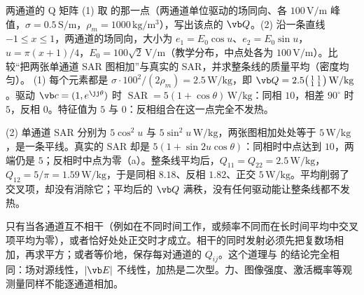 \begin{example}[label=ex:framework-twochannel]{两通道的 Q 矩阵}
(1) 取 的那一点（两通道单位驱动的场同向、各 $100\,\mathrm{V/m}$ 峰值，$\sigma=0.5\,\mathrm{S/m}$，$\rho_m=1000\,\mathrm{kg/m^3}$），写出该点的 $\vb Q$。(2) 沿一条直线 $-1\le x\le1$，两通道的场同向，大小为 $e_1=E_0\cos u$、$e_2=E_0\sin u$，$u=\pi(x+1)/4$，$E_0=100\sqrt2\,\mathrm{V/m}$（教学分布，中点处各为 $100\,\mathrm{V/m}$）。比较“把两张单通道 SAR 图相加”与真实的 SAR，并求整条线的质量平均（密度均匀）。
\solution
(1) 每个元素都是 $\sigma\cdot100^2/(2\rho_m)=2.5\,\mathrm{W/kg}$，即 $\vb Q=2.5\bigl(\begin{smallmatrix}1&1\\1&1\end{smallmatrix}\bigr)\,\mathrm{W/kg}$。驱动 $\vb c=(1,e^{\jj\theta})$ 时 $\operatorname{SAR}=5(1+\cos\theta)\,\mathrm{W/kg}$：同相 $10$，相差 $90^\circ$ 时 $5$，反相 $0$。特征值为 $5$ 与 $0$：反相组合在这一点完全不发热。

(2) 单通道 SAR 分别为 $5\cos^2u$ 与 $5\sin^2u\,\mathrm{W/kg}$，两张图相加处处等于 $5\,\mathrm{W/kg}$，是一条平线。真实的 SAR 却是 $5(1+\sin2u\cos\theta)$：同相时中点达到 $10$，两端仍是 $5$；反相时中点为零（a）。整条线平均后，$Q_{11}=Q_{22}=2.5\,\mathrm{W/kg}$，$Q_{12}=5/\pi=1.59\,\mathrm{W/kg}$，于是同相 $8.18$、反相 $1.82$、正交 $5\,\mathrm{W/kg}$。平均削弱了交叉项，却没有消除它；平均后的 $\vb Q$ 满秩，没有任何驱动能让整条线都不发热。
\end{example}


\begin{pitfall}
只有当各通道互不相干（例如在不同时间工作，或频率不同而在长时间平均中交叉项平均为零），或者恰好处处正交时才成立。相干的同时发射必须先把复数场相加，再求平方；或者等价地，保存每对通道的 $Q_{ij}$。这个道理与 的结论完全相同：场对源线性，$|\vb E|$ 不线性，加热是二次型。力、图像强度、激活概率等观测量同样不能逐通道相加。
\end{pitfall}

